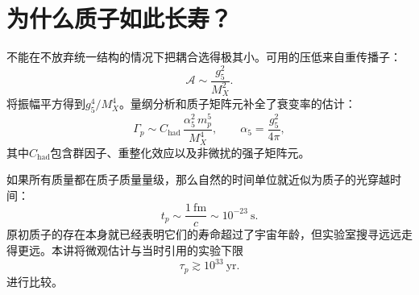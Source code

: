 \section{为什么质子如此长寿？}

\begin{classroomqa}
\end{classroomqa}

不能在不放弃统一结构的情况下把耦合选得极其小。可用的压低来自重传播子：
\begin{equation}
\mathcal A
\sim
\frac{g_5^2}{M_X^2}.
\label{eq:l10-amplitude}
\end{equation}
将振幅平方得到\(g_5^4/M_X^4\)。量纲分析和质子矩阵元补全了衰变率的估计：
\begin{equation}
\Gamma_p
\sim
C_{\mathrm{had}}\,
\frac{\alpha_5^2\,m_p^5}{M_X^4},
\qquad
\alpha_5=\frac{g_5^2}{4\pi},
\label{eq:l10-rate}
\end{equation}
其中\(C_{\mathrm{had}}\)包含群因子、重整化效应以及非微扰的强子矩阵元。


\begin{classroomqa}
\end{classroomqa}

如果所有质量都在质子质量量级，那么自然的时间单位就近似为质子的光穿越时间：
\begin{equation}
t_p\sim\frac{1\ \mathrm{fm}}{c}\sim10^{-23}\ \mathrm{s}.
\label{eq:l10-proton-time}
\end{equation}
原初质子的存在本身就已经表明它们的寿命超过了宇宙年龄，但实验室搜寻远远走得更远。本讲将微观估计与当时引用的实验下限
\begin{equation}
\tau_p\gtrsim10^{33}\ \mathrm{yr}.
\label{eq:l10-lifetime-bound}
\end{equation}进行比较。

